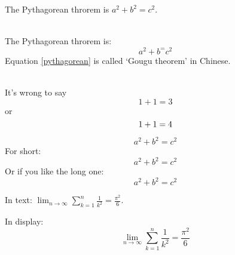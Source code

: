 \documentclass[12pt]{ctexrep}
\begin{document}

\setlength{\parindent}{0em}
The Pythagorean throrem is $a^2 + b^2 = c^2$.

\hspace*{\fill} \\
The Pythagorean throrem is:
\begin{equation}
a^2 + b^ = c^2 \label{pythagorean}   
\end{equation}
Equation \eqref{pythagorean} is 
called `Gougu theorem' in Chinese.

\hspace*{\fill} \\
It's wrong to say
\begin{equation}
1 + 1 = 3 \tag{dumb}
\end{equation}
or
\begin{equation}
1 + 1 = 4 \notag
\end{equation}


\begin{equation*}
a^2 + b^2 = c^2    
\end{equation*}
For short:
\[ a^2 + b^2 = c^2 \]
Or if you like the long one:
\begin{displaymath}
a^2 + b^2 = c^2
\end{displaymath}

In text:
$\lim_{n \to \infty}
\sum_{k=1}^n \frac{1}{k^2}
= \frac{\pi^2}{6}$.

In display:
\[
\lim_{n \to \infty}
\sum_{k=1}^n \frac{1}{k^2}
= \frac{\pi^2}{6}    
\]

\end{document}
